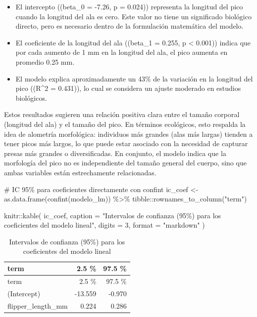 \documentclass[
  spanish,
  11pt,
  a4paper,
  DIV=11,
  numbers=noendperiod]{scrartcl}
\newenvironment{Shaded}{\begin{snugshade}}{\end{snugshade}}
\newcommand{\AttributeTok}[1]{\textcolor[rgb]{0.40,0.45,0.13}{#1}}
\newcommand{\CommentTok}[1]{\textcolor[rgb]{0.37,0.37,0.37}{#1}}
\newcommand{\DecValTok}[1]{\textcolor[rgb]{0.68,0.00,0.00}{#1}}
\newcommand{\FunctionTok}[1]{\textcolor[rgb]{0.28,0.35,0.67}{#1}}
\newcommand{\NormalTok}[1]{\textcolor[rgb]{0.00,0.23,0.31}{#1}}
\newcommand{\OtherTok}[1]{\textcolor[rgb]{0.00,0.23,0.31}{#1}}
\newcommand{\SpecialCharTok}[1]{\textcolor[rgb]{0.37,0.37,0.37}{#1}}
\newcommand{\StringTok}[1]{\textcolor[rgb]{0.13,0.47,0.30}{#1}}
\begin{document}
\begin{itemize}
\item
  El intercepto ((beta\_0 = -7.26, p = 0.024)) representa la longitud
  del pico cuando la longitud del ala es cero. Este valor no tiene un
  significado biológico directo, pero es necesario dentro de la
  formulación matemática del modelo.
\item
  El coeficiente de la longitud del ala ((beta\_1 = 0.255, p \textless{}
  0.001)) indica que por cada aumento de 1 mm en la longitud del ala, el
  pico aumenta en promedio 0.25 mm.
\item
  El modelo explica aproximadamente un 43\% de la variación en la
  longitud del pico ((R\^{}2 = 0.431)), lo cual se considera un ajuste
  moderado en estudios biológicos.
\end{itemize}

Estos resultados sugieren una relación positiva clara entre el tamaño
corporal (longitud del ala) y el tamaño del pico. En términos
ecológicos, esto respalda la idea de alometría morfológica: individuos
más grandes (alas más largas) tienden a tener picos más largos, lo que
puede estar asociado con la necesidad de capturar presas más grandes o
diversificadas. En conjunto, el modelo indica que la morfología del pico
no es independiente del tamaño general del cuerpo, sino que ambas
variables están estrechamente relacionadas.

\begin{Shaded}
\begin{Highlighting}[numbers=left,,]
\CommentTok{\# IC 95\% para coeficientes directamente con confint}
\NormalTok{ic\_coef }\OtherTok{\textless{}{-}} \FunctionTok{as.data.frame}\NormalTok{(}\FunctionTok{confint}\NormalTok{(modelo\_lm)) }\SpecialCharTok{\%\textgreater{}\%}
\NormalTok{  tibble}\SpecialCharTok{::}\FunctionTok{rownames\_to\_column}\NormalTok{(}\StringTok{"term"}\NormalTok{)}

\NormalTok{knitr}\SpecialCharTok{::}\FunctionTok{kable}\NormalTok{(}
\NormalTok{  ic\_coef,}
  \AttributeTok{caption =} \StringTok{"Intervalos de confianza (95\%) }
\StringTok{  para los coeficientes del modelo lineal"}\NormalTok{,}
  \AttributeTok{digits =} \DecValTok{3}\NormalTok{,}
  \AttributeTok{format =} \StringTok{"markdown"}
\NormalTok{)}
\end{Highlighting}
\end{Shaded}

\begin{longtable}[]{@{}lrr@{}}
\caption{Intervalos de confianza (95\%) para los coeficientes del modelo
lineal}\tabularnewline
\toprule\noalign{}
term & 2.5 \% & 97.5 \% \\
\midrule\noalign{}
\endfirsthead
\toprule\noalign{}
term & 2.5 \% & 97.5 \% \\
\midrule\noalign{}
\endhead
\bottomrule\noalign{}
\endlastfoot
(Intercept) & -13.559 & -0.970 \\
flipper\_length\_mm & 0.224 & 0.286 \\
\end{longtable}
\end{document}
